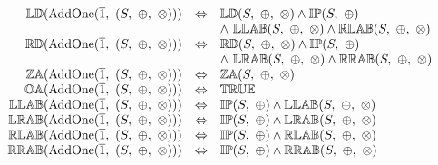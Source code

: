 \[
\begin{array}{rcl} 
\propname{LD}(\mathrm{AddOne}(\overline{1},\ (S,\ \oplus,\ \otimes))) 
    & \Leftrightarrow %
    & \propname{LD}(S,\ \oplus,\ \otimes) 
      \wedge  \propname{IP}(S,\ \oplus) \\
	&&
      \wedge \ \propname{LLAB}(S,\ \oplus,\ \otimes) 
      \wedge \propname{RLAB}(S,\ \oplus,\ \otimes)
    \\
\propname{RD}(\mathrm{AddOne}(\overline{1},\ (S,\ \oplus,\ \otimes))) 
    & \Leftrightarrow %
    & \propname{RD}(S,\ \oplus,\ \otimes) 
      \wedge \propname{IP}(S,\ \oplus)  \\
	&&
      \wedge \ \propname{LRAB}(S,\ \oplus,\ \otimes) 
      \wedge \propname{RRAB}(S,\ \oplus,\ \otimes)
    \\
\propname{ZA}(\mathrm{AddOne}(\overline{1},\ (S,\ \oplus,\ \otimes))) 
    & \Leftrightarrow
    & \propname{ZA}(S,\ \oplus,\ \otimes) \\
\propname{OA}(\mathrm{AddOne}(\overline{1},\ (S,\ \oplus,\ \otimes))) 
    & \Leftrightarrow
    & \propname{TRUE}\\ 
\propname{LLAB}(\mathrm{AddOne}(\overline{1},\ (S,\ \oplus,\ \otimes))) 
    & \Leftrightarrow
    & \propname{IP}(S,\ \oplus) 
      \wedge \propname{LLAB}(S,\ \oplus,\ \otimes)
\\
\propname{LRAB}(\mathrm{AddOne}(\overline{1},\ (S,\ \oplus,\ \otimes))) 
    & \Leftrightarrow
    & \propname{IP}(S,\ \oplus) 
      \wedge \propname{LRAB}(S,\ \oplus,\ \otimes)
\\ 
\propname{RLAB}(\mathrm{AddOne}(\overline{1},\ (S,\ \oplus,\ \otimes))) 
    & \Leftrightarrow
    & \propname{IP}(S,\ \oplus) 
      \wedge \propname{RLAB}(S,\ \oplus,\ \otimes)
\\
\propname{RRAB}(\mathrm{AddOne}(\overline{1},\ (S,\ \oplus,\ \otimes))) 
    & \Leftrightarrow
    & \propname{IP}(S,\ \oplus) 
      \wedge \propname{RRAB}(S,\ \oplus,\ \otimes)
\\ 
\end{array} 
\] 
